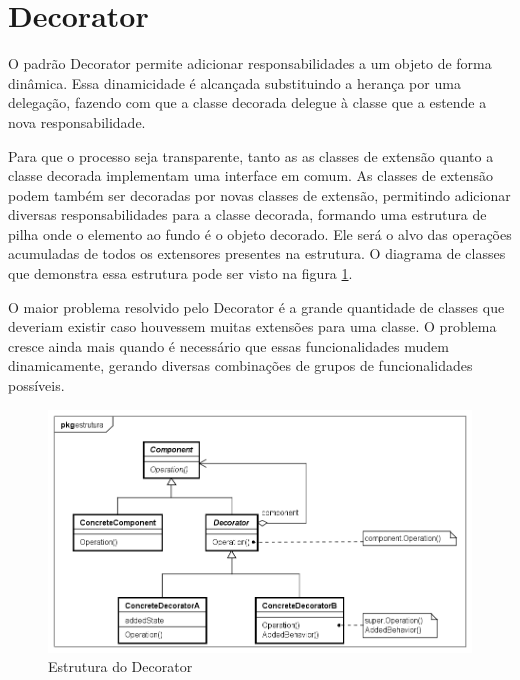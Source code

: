 \section{Decorator}

O padrão Decorator permite adicionar responsabilidades a um 
objeto de forma dinâmica. Essa dinamicidade é alcançada 
substituindo a herança por uma delegação, fazendo com 
que a classe decorada delegue à classe que a estende 
a nova responsabilidade.

Para que o processo seja transparente, tanto as 
as classes de extensão quanto a classe decorada 
implementam uma interface em comum. As classes 
de extensão podem também ser decoradas por 
novas classes de extensão, permitindo adicionar 
diversas responsabilidades para a classe decorada, 
formando uma estrutura de pilha onde o elemento ao 
fundo é o objeto decorado. Ele será o 
alvo das operações acumuladas de todos os extensores 
presentes na estrutura. O diagrama de classes que 
demonstra essa estrutura pode ser visto na figura 
\ref{decorator_struct}.

O maior problema resolvido pelo Decorator é a grande 
quantidade de classes que deveriam existir caso houvessem 
muitas extensões para uma classe. O problema cresce ainda 
mais quando é necessário que essas funcionalidades mudem 
dinamicamente, gerando diversas combinações de grupos de 
funcionalidades possíveis.

\begin{figure}[htb]
	\caption{\label{decorator_struct}Estrutura do Decorator}
	\begin{center}
	    \includegraphics[scale=0.5]{5_padroes-contexto-funcional/5.2_estruturais/5.2.4_decorator/decorator_estrutura.png}
	\end{center}
\end{figure}


